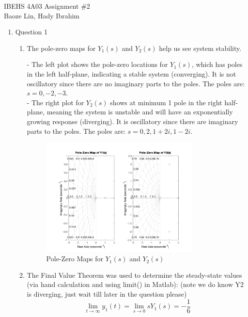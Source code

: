 \documentclass[12pt]{article}
\begin{document}
IBEHS 4A03 \hfill Assignment \#2\\
Baoze Lin, Hady Ibrahim

\hrulefill

\renewcommand{\theenumii}{\arabic{enumi}.\arabic{enumii}}

\begin{enumerate}
\item Question 1
  \begin{enumerate}
    \item
    The pole-zero maps for \( Y_1(s) \) and \( Y_2(s) \) help us see system stability. 

    - The left plot shows the pole-zero locations for \( Y_1(s) \), which has poles in the left half-plane, indicating a stable system (converging). It is not oscillatory since there are no imaginary parts to the poles. The poles are: $s=0, -2, -3$. \\
    - The right plot for \( Y_2(s) \) shows at minimum 1 pole in the right half-plane, meaning the system is unstable and will have an exponentially growing response (diverging). It is oscillatory since there are imaginary parts to the poles. The poles are: $s=0, 2, 1+2i, 1-2i$.

    \begin{figure}[H]
      \centering
      \includegraphics[width=0.8\textwidth]{Figures/figure1-1.png}
      \caption{Pole-Zero Maps for \( Y_1(s) \) and \( Y_2(s) \)}
      \label{fig:figure11} 
    \end{figure}

    \pagebreak
    \item
    The Final Value Theorem was used to determine the steady-state values (via hand calculation and using limit() in Matlab):
    (note we do know Y2 is diverging, just wait till later in the question please)
    \[
    \lim_{t \to \infty} y_1(t) = \lim_{s \to 0} s Y_1(s) = -\frac{1}{6}
    \]


\end{enumerate}
\end{enumerate}
\end{document}
